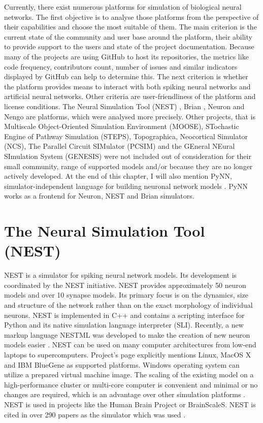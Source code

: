 Currently, there exist numerous platforms for simulation of biological neural networks. The first objective is to analyse those platforms from the perspective of their capabilities and choose the most suitable of them. The main criterion is the current state of the community and user base around the platform, their ability to provide support to the users and state of the project documentation. Because many of the projects are using GitHub to host its repositories, the metrics like code frequency, contributors count, number of issues and similar indicators displayed by GitHub can help to determine this. The next criterion is whether the platform provides means to interact with both spiking neural networks and artificial neural networks. Other criteria are user-friendliness of the platform and license conditions. The Neural Simulation Tool (NEST) \cite{jordanNEST182019}, Brian \cite{stimbergBrianIntuitiveEfficient2019}, Neuron \cite{carnevaleNEURONBook06} and Nengo \cite{bekolayNengoPythonTool2014} are platforms, which were analysed more precisely. Other projects, that is Multiscale Object-Oriented Simulation Environment (MOOSE), STochastic Engine of Pathway Simulation (STEPS), Topographica, Neocortical Simulator (NCS), The Parallel Circuit SIMulator (PCSIM) and the GEneral NEural SImulation System (GENESIS) were not included out of consideration for their small community, range of supported models and/or because they are no longer actively developed. At the end of this chapter, I will also mention PyNN, simulator-independent language for building neuronal network models \cite{davisonPyNNCommonInterface2009}. PyNN works as a frontend for Neuron, NEST and Brian simulators.

\section{The Neural Simulation Tool (NEST)}

NEST is a simulator for spiking neural network models. Its development is coordinated by the NEST initiative. NEST provides approximately 50 neuron models and over 10 synapse models. Its primary focus is on the dynamics, size and structure of the network rather than on the exact morphology of individual neurons. NEST is implemented in C++ and contains a scripting interface for Python and its native simulation language interpreter (SLI). Recently, a new markup language NESTML was developed to make the creation of new neuron models easier \cite{plotnikovNESTMLModelingLanguage2016}.  NEST can be used on many computer architectures from low-end laptops to supercomputers. Project's page explicitly mentions Linux, MacOS X and IBM BlueGene as supported platforms. Windows operating system can utilize a prepared virtual machine image. The scaling of the existing model on a high-performance cluster or multi-core computer is convenient and minimal or no changes are required, which is an advantage over other simulation platforms \cite{tikidji-hamburyanSoftwareBrainNetwork2017}. NEST is used in projects like the Human Brain Project or BrainScaleS. NEST is cited in over 290 papers as the simulator which was used \cite{julichaachenresearchallianceNESTNeuralSimulation2015}.

